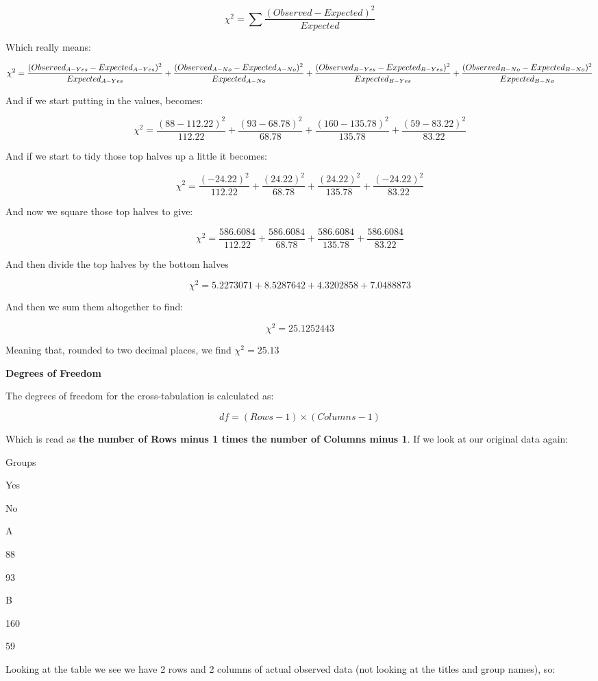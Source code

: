\documentclass[
  oneside]{book}
\begin{document}
\[\chi^2 = \sum\frac{(Observed - Expected)^2}{Expected}\]

Which really means:

\[\chi^2 = \frac{(Observed_{A-Yes} - Expected_{A-Yes})^2}{Expected_{A-Yes}} + \frac{(Observed_{A-No} - Expected_{A-No})^2}{Expected_{A-No}} + \\ \frac{(Observed_{B-Yes} - Expected_{B-Yes})^2}{Expected_{B-Yes}} +  \frac{(Observed_{B-No} - Expected_{B-No})^2}{Expected_{B-No}}\]

And if we start putting in the values, becomes:

\[\chi^2 = \frac{(88 - 112.22)^2}{112.22}+ \frac{(93 - 68.78)^2}{68.78}+\frac{(160 - 135.78)^2}{135.78}+\frac{(59 - 83.22)^2}{83.22}\]

And if we start to tidy those top halves up a little it becomes:

\[\chi^2 = \frac{(-24.22)^2}{112.22}+ \frac{(24.22)^2}{68.78}+\frac{(24.22)^2}{135.78}+\frac{(-24.22)^2}{83.22}\]

And now we square those top halves to give:

\[\chi^2 = \frac{586.6084}{112.22} + \frac{586.6084}{68.78} + \frac{586.6084}{135.78} + \frac{586.6084}{83.22} \]

And then divide the top halves by the bottom halves

\[\chi^2 = {5.2273071} + {8.5287642} + {4.3202858} + {7.0488873}\]

And then we sum them altogether to find:

\[\chi^2 = 25.1252443 \]

Meaning that, rounded to two decimal places, we find \(\chi^2 = 25.13\)

\textbf{Degrees of Freedom}

The degrees of freedom for the cross-tabulation is calculated as:

\[df = (Rows - 1) \times (Columns - 1)\]

Which is read as \textbf{the number of Rows minus 1 times the number of Columns minus 1}. If we look at our original data again:

Groups

Yes

No

A

88

93

B

160

59

Looking at the table we see we have 2 rows and 2 columns of actual observed data (not looking at the titles and group names), so:
\end{document}
